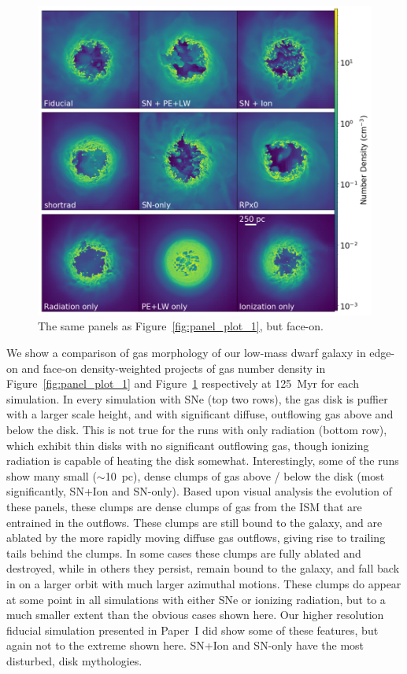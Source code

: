 \documentclass[twocolumn]{aastex62}
\begin{document}
\begin{figure}
  \centering
  \includegraphics[width=0.95\linewidth]{figures/proj_plot_n_z_125.png}
  \caption{The same panels as Figure~\ref{fig:panel_plot_1}, but face-on.}
  \label{fig:panel_plot_2}
\end{figure}

We show a comparison of gas morphology of our low-mass dwarf galaxy in edge-on and face-on density-weighted projects of gas number density in Figure~\ref{fig:panel_plot_1} and Figure~\ref{fig:panel_plot_2} respectively at 125~Myr for each simulation. In every simulation with SNe (top two rows), the gas disk is puffier with a larger scale height, and with significant diffuse, outflowing gas above and below the disk. This is not true for the runs with only radiation (bottom row), which exhibit thin disks with no significant outflowing gas, though ionizing radiation is capable of heating the disk somewhat. Interestingly, some of the runs show many small ($\sim$10~pc), dense clumps of gas above / below the disk (most significantly, SN+Ion and SN-only). Based upon visual analysis the evolution of these panels, these clumps are dense clumps of gas from the ISM that are entrained in the outflows. These clumps are still bound to the galaxy, and are ablated by the more rapidly moving diffuse gas outflows, giving rise to trailing tails behind the clumps. In some cases these clumps are fully ablated and destroyed, while in others they persist, remain bound to the galaxy, and fall back in on a larger orbit with much larger azimuthal motions. These clumps do appear at some point in all simulations with either SNe or ionizing radiation, but to a much smaller extent than the obvious cases shown here. Our higher resolution fiducial simulation presented in Paper~I did show some of these features, but again not to the extreme shown here. SN+Ion and SN-only have the most disturbed, disk mythologies. 
\end{document}
